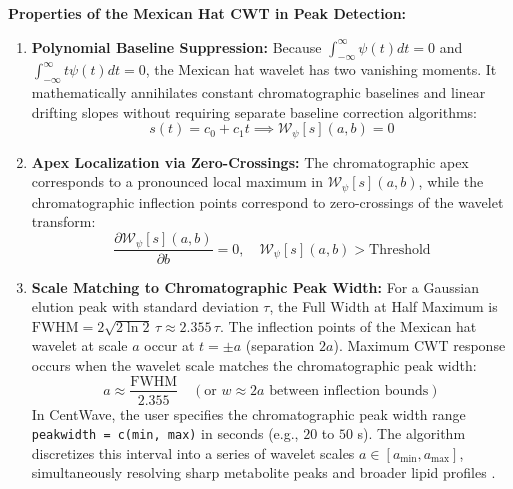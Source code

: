 \documentclass[11pt,twoside,openright]{book}
\begin{document}
\begin{svgraybox}
\textbf{Properties of the Mexican Hat CWT in Peak Detection:}\\
\begin{enumerate}
    \item \textbf{Polynomial Baseline Suppression:} Because $\int_{-\infty}^\infty \psi(t) dt = 0$ and $\int_{-\infty}^\infty t \psi(t) dt = 0$, the Mexican hat wavelet has two vanishing moments. It mathematically annihilates constant chromatographic baselines and linear drifting slopes without requiring separate baseline correction algorithms:
    \begin{equation*}
    s(t) = c_0 + c_1 t \implies \mathcal{W}_\psi[s](a, b) = 0
    \end{equation*}
    \item \textbf{Apex Localization via Zero-Crossings:} The chromatographic apex corresponds to a pronounced local maximum in $\mathcal{W}_\psi[s](a, b)$, while the chromatographic inflection points correspond to zero-crossings of the wavelet transform:
    \begin{equation*}
    \frac{\partial \mathcal{W}_\psi[s](a, b)}{\partial b} = 0, \quad \mathcal{W}_\psi[s](a, b) > \text{Threshold}
    \end{equation*}
    \item \textbf{Scale Matching to Chromatographic Peak Width:} For a Gaussian elution peak with standard deviation $\tau$, the Full Width at Half Maximum is $\text{FWHM} = 2\sqrt{2\ln 2} \, \tau \approx 2.355 \, \tau$. The inflection points of the Mexican hat wavelet at scale $a$ occur at $t = \pm a$ (separation $2a$). Maximum CWT response occurs when the wavelet scale matches the chromatographic peak width:
    \begin{equation*}
    a \approx \frac{\text{FWHM}}{2.355} \quad \left(\text{or } w \approx 2a \text{ between inflection bounds}\right)
    \end{equation*}
    In CentWave, the user specifies the chromatographic peak width range \texttt{peakwidth = c(min, max)} in seconds (e.g., $20$ to $50$ s). The algorithm discretizes this interval into a series of wavelet scales $a \in [a_{\min}, a_{\max}]$, simultaneously resolving sharp metabolite peaks and broader lipid profiles \cite{tautenhahn2008highly}.
\end{enumerate}
\end{svgraybox}
\end{document}
